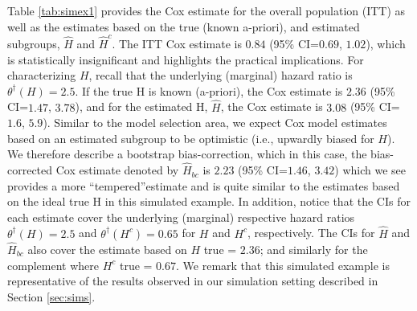 \documentclass[smallextended]{svjour3}
\def\hplim{\theta^{\dagger}(H)}
\def\hcplim{\theta^{\dagger}(H^{c})}
\begin{document}
Table \ref{tab:simex1} provides the Cox estimate for the overall population (ITT) as well as the estimates based on the true (known a-priori), and estimated subgroups, $\hat{H}$ and $\hat{H}^{c}$.  The ITT Cox estimate is $0.84$ (95\% CI=$0.69$, $1.02$), 
which is statistically insignificant and highlights the practical implications.  For characterizing $H$, recall that the underlying (marginal) hazard ratio is $\hplim =2.5$.  If the true H is known (a-priori), the Cox estimate is $2.36$ (95\% CI=$1.47$, $3.78$), and for the estimated H, $\hat{H}$, the Cox estimate is $3.08$ (95\% CI=$1.6$, 
$5.9$).  Similar to the model selection area, we expect Cox model estimates based on an estimated subgroup to be optimistic (i.e., upwardly biased for $H$).  We therefore describe a bootstrap bias-correction, which in this case, the bias-corrected Cox estimate denoted by $\hat{H}_{bc}$ is $2.23$ (95\% CI=$1.46$, $3.42$) which we see provides a more ``tempered''estimate and is quite similar to the estimates based on the ideal true H in this simulated example.  
In addition, notice that the CIs for each estimate cover the underlying (marginal) respective hazard ratios 
$\hplim =2.5$ and $\hcplim =0.65$ for $H$ and $H^{c}$, respectively.  
The CIs for $\hat{H}$ and $\hat{H}_{bc}$ also cover the estimate based on $H$ true =  $2.36$; and similarly for the complement where $H^{c}$ true =  $0.67$.  We remark that this simulated example is representative of the results observed in our simulation setting described in Section \ref{sec:sims}.










\end{document}
